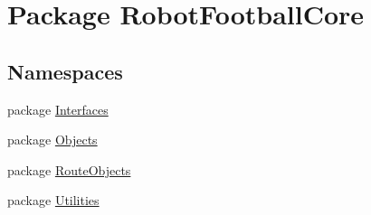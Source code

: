 \hypertarget{namespace_robot_football_core}{\section{Package Robot\-Football\-Core}
\label{namespace_robot_football_core}
}
\subsection*{Namespaces}
\begin{DoxyCompactItemize}
\item 
package \hyperlink{namespace_robot_football_core_1_1_interfaces}{Interfaces}
\item 
package \hyperlink{namespace_robot_football_core_1_1_objects}{Objects}
\item 
package \hyperlink{namespace_robot_football_core_1_1_route_objects}{Route\-Objects}
\item 
package \hyperlink{namespace_robot_football_core_1_1_utilities}{Utilities}
\end{DoxyCompactItemize}
